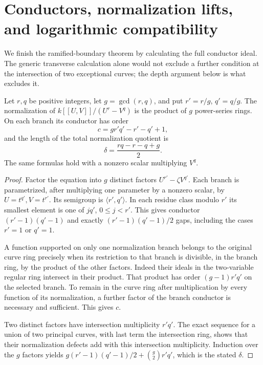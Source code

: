 \section{Conductors, normalization lifts, and logarithmic compatibility}
\label{sec:conductors-v170}
We finish the ramified-boundary theorem by calculating the full
conductor ideal. The generic transverse calculation alone would not
exclude a further condition at the intersection of two exceptional
curves; the depth argument below is what excludes it.

\begin{lemma}\label{lem:binomial-conductor-v170}
Let $r,q$ be positive integers, let $g=\gcd(r,q)$, and put
$r'=r/g$, $q'=q/g$. The normalization of
$k[[U,V]]/(U^r-V^q)$ is the product of $g$ power-series rings.
On each branch its conductor has order
\[
 c=g r'q'-r'-q'+1,
\]
and the length of the total normalization quotient is
\[
 \delta=\frac{rq-r-q+g}{2}.
\]
The same formulas hold with a nonzero scalar multiplying $V^q$.
\end{lemma}
\begin{proof}
Factor the equation into $g$ distinct factors
$U^{r'}-\zeta V^{q'}$. Each branch is parametrized, after multiplying
one parameter by a nonzero scalar, by
$U=t^{q'}, V=t^{r'}$. Its semigroup is
$\langle r',q'\rangle$. In each residue class modulo $r'$ its
smallest element is one of $j q'$, $0\leq j<r'$. This gives conductor
$(r'-1)(q'-1)$ and exactly $(r'-1)(q'-1)/2$ gaps, including the
cases $r'=1$ or $q'=1$.

A function supported on only one normalization branch belongs to the
original curve ring precisely when its restriction to that branch
is divisible, in the branch ring, by the product of the other factors.
Indeed their ideals in the two-variable regular ring intersect in
their product. That product has order $(g-1)r'q'$ on the selected
branch. To remain in the curve ring after multiplication by every
function of its normalization, a further factor of the branch
conductor is necessary and sufficient. This gives $c$.

Two distinct factors have intersection multiplicity $r'q'$.
The exact sequence for a union of two principal curves, with last
term the intersection ring, shows that their normalization defects
add with this intersection multiplicity. Induction over the $g$
factors yields
$g(r'-1)(q'-1)/2+\binom g2r'q'$, which is the stated $\delta$.
\end{proof}

